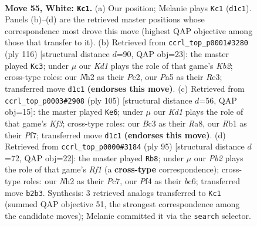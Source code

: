 \documentclass[11pt]{article}
\begin{document}
\clearpage

\begin{figure}[p]\centering
\begin{subfigure}{0.46\textwidth}\centering
\resizebox{\linewidth}{!}{%
\newchessgame
\chessboard[
  setfen={r2k1b2/6p1/p1p4r/Pp1b1p1p/2p2P1P/2B1P1P1/1P5N/1R1K2R1 w - - 11 55},
  showmover=false,
  pgfstyle=straightmove, color=movearrow, markmove={d1-c1}
]}
\caption{}
\end{subfigure}\hfill
\begin{subfigure}{0.46\textwidth}\centering
\resizebox{\linewidth}{!}{%
\newchessgame
\chessboard[
  setfen={r3r3/4kp2/p3p1p1/PpNpB1Pp/1P5P/3PRP1b/1KP5/8 w - - 37 59},
  showmover=false,
  pgfstyle=straightmove, color=movearrow, markmove={b2-c3}
]}
\caption{}
\end{subfigure}
\\[4pt]
\begin{subfigure}{0.46\textwidth}\centering
\resizebox{\linewidth}{!}{%
\newchessgame
\chessboard[
  setfen={r7/5p2/1p1r1k2/1B1p3p/P1pPp2P/4PbP1/PR3P2/1R4K1 b - - 18 53},
  showmover=false,
  pgfstyle=straightmove, color=movearrow, markmove={f6-e6}
]}
\caption{}
\end{subfigure}\hfill
\begin{subfigure}{0.46\textwidth}\centering
\resizebox{\linewidth}{!}{%
\newchessgame
\chessboard[
  setfen={5r2/2p2b1p/2Bp1k1r/pPp2p2/P1P2Pp1/4P3/1R3P1P/2R3K1 b - - 47 48},
  showmover=false,
  pgfstyle=straightmove, color=movearrow, markmove={f8-b8}
]}
\caption{}
\end{subfigure}
\caption{\textbf{Move 55, White: \texttt{Kc1}.} (a) Our position; Melanie plays \texttt{Kc1} (\texttt{d1c1}). Panels (b)--(d) are the retrieved master positions whose correspondence most drove this move (highest QAP objective among those that transfer to it). (b) Retrieved from \texttt{ccrl\_top\_p0001\#3280} (ply 116) [structural distance $d$=90, QAP obj=23]: the master played \texttt{Kc3}; under $\mu$ our \emph{Kd1} plays the role of that game's \emph{Kb2}; cross-type roles: our \emph{N}h2 as their \emph{P}c2, our \emph{P}a5 as their \emph{R}e3; transferred move \texttt{d1c1} \textbf{(endorses this move)}. (c) Retrieved from \texttt{ccrl\_top\_p0003\#2908} (ply 105) [structural distance $d$=56, QAP obj=15]: the master played \texttt{Ke6}; under $\mu$ our \emph{Kd1} plays the role of that game's \emph{Kf3}; cross-type roles: our \emph{B}c3 as their \emph{R}a8, our \emph{R}b1 as their \emph{P}f7; transferred move \texttt{d1c1} \textbf{(endorses this move)}. (d) Retrieved from \texttt{ccrl\_top\_p0000\#3184} (ply 95) [structural distance $d$=72, QAP obj=22]: the master played \texttt{Rb8}; under $\mu$ our \emph{Pb2} plays the role of that game's \emph{Rf1} (a \textbf{cross-type} correspondence); cross-type roles: our \emph{N}h2 as their \emph{P}c7, our \emph{P}f4 as their \emph{b}c6; transferred move \texttt{b2b3}. Synthesis: 3 retrieved analogs transferred to \texttt{Kc1} (summed QAP objective 51, the strongest correspondence among the candidate moves); Melanie committed it via the \texttt{search} selector.}
\label{fig:thought-m108}
\end{figure}
\end{document}

